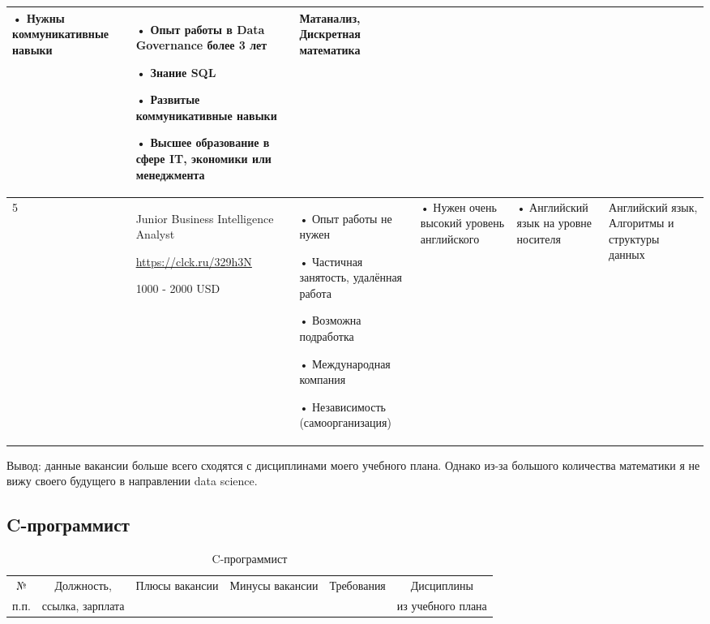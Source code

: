 \begin{landscape}
\begin{table}[H]
\begin{center}
\begin{small}
\begin{tabular}{|p{0.1cm}|p{5cm}|p{4.5cm}|p{4.5cm}|p{4cm}|p{3cm}|}
				• Нужны коммуникативные навыки
				&
				• Опыт работы в Data Governance более 3 лет
				
				• Знание SQL
				
				• Развитые коммуникативные навыки
				
				• Высшее образование в сфере IT, экономики или менеджмента
				&
				Матанализ, Дискретная математика
				\\
			    \hline
                5 & Junior Business Intelligence Analyst
			
			\url{https://clck.ru/329h3N}
			
			1000 - 2000 USD
			&
			• Опыт работы не нужен
			
			• Частичная занятость, удалённая работа
			
			• Возможна подработка
			
			• Международная компания
			
			• Независимость (самоорганизация)
			&
			• Нужен очень высокий уровень английского
			&
			• Английский язык на уровне носителя
			&
			Английский язык, Алгоритмы и структуры данных
			\\
			\hline
       
			\end{tabular}
		\end{small}
	\end{center}
\end{table}

Вывод: данные вакансии больше всего сходятся с дисциплинами моего учебного плана. Однако из-за большого количества математики я не вижу своего будущего в направлении data science.
\begin{table}[H]
    \subsection{C-программист}\caption{C-программист}
	\begin{center}
		\begin{small}
		\begin{tabular}{|p{0.1cm}|p{5cm}|p{4.5cm}|p{4.5cm}|p{4cm}|p{3cm}|} \hline
			\multicolumn{1}{|c|}{№}&\multicolumn{1}{c|}{Должность,}&\multicolumn{1}{c|}{Плюсы вакансии}&\multicolumn{1}{c|}{Минусы вакансии}&\multicolumn{1}{c|}{Требования}&\multicolumn{1}{c|}{Дисциплины}\\ 
			\multicolumn{1}{|c|}{п.п.}&\multicolumn{1}{c|}{ссылка, зарплата}&\multicolumn{1}{c|}{}&\multicolumn{1}{c|}{}&\multicolumn{1}{c|}{}&\multicolumn{1}{c|}{из учебного плана}\\ 
			\hline
				

\end{tabular}
\end{small}
\end{center}
\end{table}
\end{landscape}
